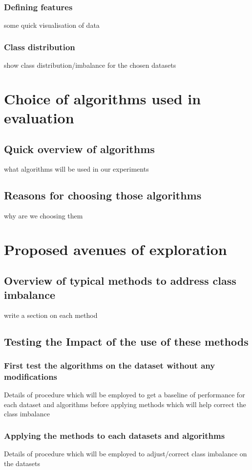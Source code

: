 \subsubsection{Defining features}
some quick visualisation of data 
\subsubsection{Class distribution}
show class distribution/imbalance for the chosen datasets


\section{Choice of algorithms used in evaluation}
\subsection{Quick overview of algorithms}
what algorithms will be used in our experiments
\subsection{Reasons for choosing those algorithms}
why are we choosing them

\section{Proposed avenues of exploration}
\subsection{Overview of typical methods to address class imbalance}
write a section on each method 
\subsection{Testing the Impact of the use of these methods}
\subsubsection{First test the algorithms on the dataset without any modifications}
Details of procedure which will be employed to get a baseline of performance for each dataset and algorithms before applying methods which will help correct the class imbalance

\subsubsection{Applying the methods to each datasets and algorithms}
Details of procedure which will be employed to adjust/correct class imbalance on the datasets


